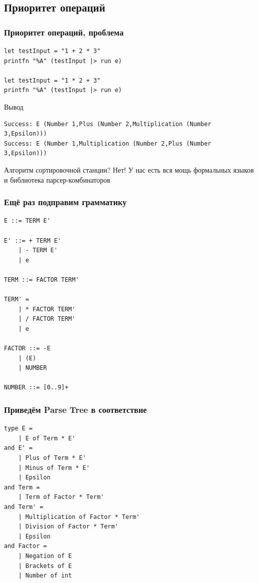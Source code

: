 \documentclass[xetex,mathserif,serif]{beamer}
\begin{document}
    \subsection{Приоритет операций}

    \begin{frame}[fragile]
        \frametitle{Приоритет операций, проблема}
        \begin{small}
            \begin{verbatim}
let testInput = "1 + 2 * 3"
printfn "%A" (testInput |> run e)

let testInput = "1 * 2 + 3"
printfn "%A" (testInput |> run e)
            \end{verbatim}

            \begin{exampleblock}{Вывод}
                \begin{verbatim}
Success: E (Number 1,Plus (Number 2,Multiplication (Number 3,Epsilon)))
Success: E (Number 1,Multiplication (Number 2,Plus (Number 3,Epsilon)))
                \end{verbatim}
            \end{exampleblock}
            Алгоритм сортировочной станции? Нет! У нас есть вся мощь формальных языков и библиотека парсер-комбинаторов
        \end{small}
    \end{frame}

    \begin{frame}[fragile]
        \frametitle{Ещё раз подправим грамматику}
        \begin{small}
            \begin{verbatim}
E ::= TERM E'

E' ::= + TERM E'
    | - TERM E'
    | e

TERM ::= FACTOR TERM'

TERM' = 
    | * FACTOR TERM'
    | / FACTOR TERM'
    | e

FACTOR ::= -E
    | (E)
    | NUMBER

NUMBER ::= [0..9]+
            \end{verbatim}
        \end{small}
    \end{frame}

    \begin{frame}[fragile]
        \frametitle{Приведём Parse Tree в соответствие}
        \begin{small}
            \begin{verbatim}
type E =
    | E of Term * E'
and E' =
    | Plus of Term * E'
    | Minus of Term * E'
    | Epsilon
and Term = 
    | Term of Factor * Term'
and Term' =
    | Multiplication of Factor * Term'
    | Division of Factor * Term'
    | Epsilon
and Factor =
    | Negation of E
    | Brackets of E
    | Number of int
            \end{verbatim}
        \end{small}
    \end{frame}
\end{document}
